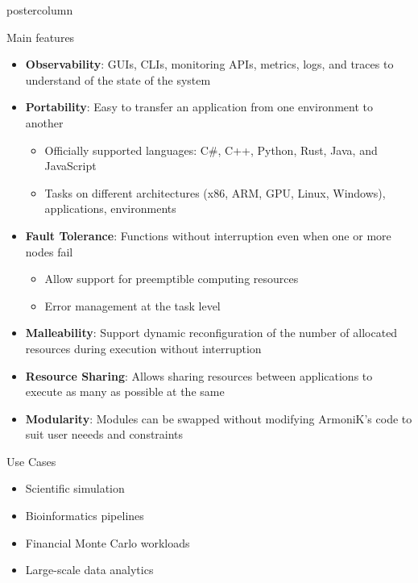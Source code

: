 \begin{frame}[fragile]
\begin{columns}[T]
\begin{column}{.49\textwidth}
\begin{beamercolorbox}[center,wd=\textwidth]{postercolumn}
\begin{minipage}[T]{.96\textwidth}
            \begin{block}{Main features}
                \begin{itemize}
                \item \textbf{Observability}: GUIs, CLIs, monitoring APIs, metrics, logs, and traces to understand of the state of the system
                \item \textbf{Portability}: Easy to transfer an application from one environment to another
                \begin{itemize}
                    \item Officially supported languages: C\#, C++, Python, Rust, Java, and JavaScript
                    \item Tasks on different architectures (x86, ARM, GPU, Linux, Windows), applications, environments
                \end{itemize}
                \item \textbf{Fault Tolerance}: Functions without interruption even when one or more nodes fail
                \begin{itemize}
                    \item Allow support for preemptible computing resources
                    \item Error management at the task level
                \end{itemize}
                \item \textbf{Malleability}: Support dynamic reconfiguration of the number of allocated resources during execution without interruption
                \item \textbf{Resource Sharing}: Allows sharing resources between applications to execute as many as possible at the same
                \item \textbf{Modularity}: Modules can be swapped without modifying ArmoniK's code to suit user neeeds and constraints
                \end{itemize}
            \end{block}

            \begin{block}{Use Cases}
            \begin{itemize}
                \item Scientific simulation
                \item Bioinformatics pipelines
                \item Financial Monte Carlo workloads
                \item Large-scale data analytics
            \end{itemize}
            \end{block}


\end{minipage}
\end{beamercolorbox}
\end{column}
\end{columns}
\end{frame}
